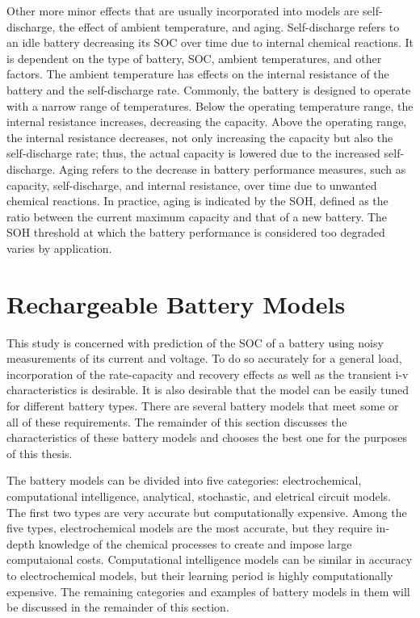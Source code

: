 Other more minor effects that are usually incorporated into models are self-discharge, the effect of ambient temperature, and aging. Self-discharge refers to an idle battery decreasing its SOC over time due to internal chemical reactions. It is dependent on the type of battery, SOC, ambient temperatures, and other factors. The ambient temperature has effects on the internal resistance of the battery and the self-discharge rate. Commonly, the battery is designed to operate with a narrow range of temperatures. Below the operating temperature range, the internal resistance increases, decreasing the capacity. Above the operating range, the internal resistance decreases, not only increasing the capacity but also the self-discharge rate; thus, the actual capacity is lowered due to the increased self-discharge. Aging refers to the decrease in battery performance measures, such as capacity, self-discharge, and internal resistance, over time due to unwanted chemical reactions. In practice, aging is indicated by the SOH, defined as the ratio between the current maximum capacity and that of a new battery. The SOH threshold at which the battery performance is considered too degraded varies by application.


\section{Rechargeable Battery Models}

This study is concerned with prediction of the SOC of a battery using noisy measurements of its current and voltage. To do so accurately for a general load, incorporation of the rate-capacity and recovery effects as well as the transient i-v characteristics is desirable. It is also desirable that the model can be easily tuned for different battery types. There are several battery models that meet some or all of these requirements. The remainder of this section discusses the characteristics of these battery models and chooses the best one for the purposes of this thesis.

The battery models can be divided into five categories: electrochemical, computational intelligence, analytical, stochastic, and eletrical circuit models. The first two types are very accurate but computationally expensive. Among the five types, electrochemical models are the most accurate, but they require in-depth knowledge of the chemical processes to create and impose large computaional costs\cite{jongerden09}. Computational intelligence models can be similar in accuracy to electrochemical models, but their learning period is highly computationally expensive\cite{capizzi11,shen02}. The remaining categories and examples of battery models in them will be discussed in the remainder of this section.

